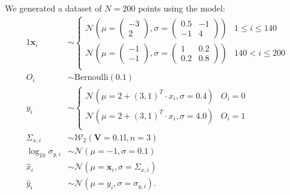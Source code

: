 \documentclass[fleqn,usenatbib]{mnras}
\begin{document}
We generated a dataset of $N = 200$ points using the model:
\begin{alignat}{1}
    \boldsymbol{x}_i& \sim
    \begin{cases}
        \mathcal N \left(
            \mu = \begin{pmatrix} -3 \\ 2 \end{pmatrix},
            \sigma = \begin{pmatrix} 0.5 & -1 \\ -1 & 4 \end{pmatrix}
        \right) &
            1 \leqslant i \leqslant 140 \\
        \mathcal N \left(
            \mu = \begin{pmatrix} -1 \\ -1 \end{pmatrix},
            \sigma = \begin{pmatrix} 1 & 0.2 \\ 0.2 & 0.8 \end{pmatrix}
        \right) &
            140 < i \leqslant 200 \\
    \end{cases}\\
    O_i& \sim \mathrm{Bernoulli}(0.1) \\
    y_i& \sim
    \begin{cases}
        \mathcal N (\mu = 2 + (3, 1)^T \cdot x_i, \sigma = 0.4) &
            O_i = 0 \\
        \mathcal N (\mu = 2 + (3, 1)^T \cdot x_i, \sigma = 4.0) &
            O_i = 1 \\
    \end{cases}\\
    \Sigma_{x, i}& \sim \mathcal W_2 (\boldsymbol{V} = 0.1 \mathbb{I}, n = 3) \\
    \log_{10} \sigma_{y, i}& \sim \mathcal N (\mu = -1, \sigma = 0.1) \\
    \hat{x}_i& \sim \mathcal N (\mu = \boldsymbol{x}_i, \sigma = \Sigma_{x, i}) \\
    \hat{y}_i& \sim \mathcal N (\mu = y_i, \sigma = \sigma_{y, i}).
\end{alignat}
\end{document}
